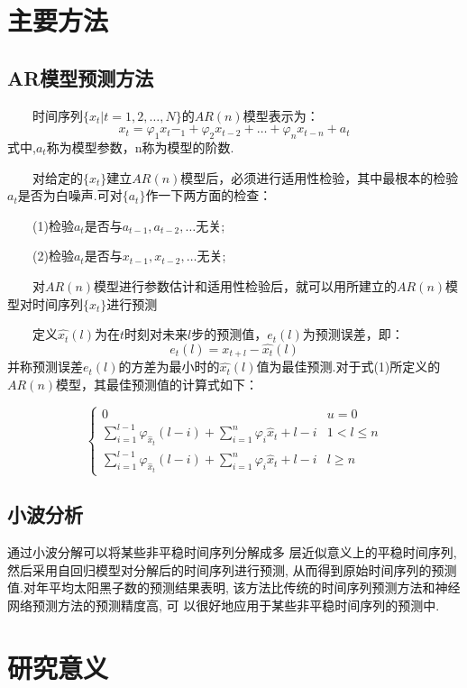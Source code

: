 \documentclass[12pt, a4paper]{ctexart}
\begin{document}
\begin{flushleft}
\section{主要方法}
\subsection{AR模型预测方法}
$\qquad$时间序列$\{x_t | t = 1, 2, \dots, N\}$的$AR(n)$模型表示为：\[
x_{t}=\varphi_{1} x_{t}-_{1}+\varphi_{2} x_{t-2}+\dots+\varphi_{n} x_{t-n}+  a_{t}
\]式中,$a_t$称为模型参数，n称为模型的阶数.

$\qquad$对给定的$\{x_t\}$建立$AR(n)$模型后，必须进行适用性检验，其中最根本的检验$a_t$是否为白噪声.可对$\{a_t\}$作一下两方面的检查：

$\qquad$(1)检验$a_t$是否与$a_{t - 1},a_{t -2}, \dots$无关;

$\qquad$(2)检验$a_t$是否与$x_{t - 1},x_{t -2}, \dots$无关;

$\qquad$对$AR(n)$模型进行参数估计和适用性检验后，就可以用所建立的$AR(n)$模型对时间序列$\{x_t\}$进行预测

$\qquad$定义$\hat{x_t}(l)$为在$t$时刻对未来$l$步的预测值，$e_t(l)$为预测误差，即：
\[
e_{t}(l)=x_{t+l}-\hat{x_{t}}(l) \tag{1}
\]
并称预测误差$e_t (l)$的方差为最小时的$\hat{x_t}(l)$值为最佳预测.对于式(1)所定义的$AR(n)$模型，其最佳预测值的计算式如下：

   \[ 
    \left\{
    \begin{array}{ll}
    {0} & {u=0} \\ 
    \sum_{i=1}^{l - 1} \varphi_{\hat{x}_{t}}(l-i)+\sum_{i=1}^{n} \varphi_{i} \hat{x}_{t}+l-i & {1 < l \leqslant n}\\
    \sum_{i=1}^{l - 1} \varphi_{\hat{x}_{t}}(l-i)+\sum_{i=1}^{n} \varphi_{i} \hat{x}_{t}+l-i & {l \ge n}
    \end{array}\right.
\]




\subsection{小波分析}
通过小波分解可以将某些非平稳时间序列分解成多
层近似意义上的平稳时间序列, 然后采用自回归模型对分解后的时间序列进行预测, 从而得到原始时间序列的预测
值.对年平均太阳黑子数的预测结果表明, 该方法比传统的时间序列预测方法和神经网络预测方法的预测精度高, 可
以很好地应用于某些非平稳时间序列的预测中.

\section{研究意义}

\end{flushleft}
\end{document}
